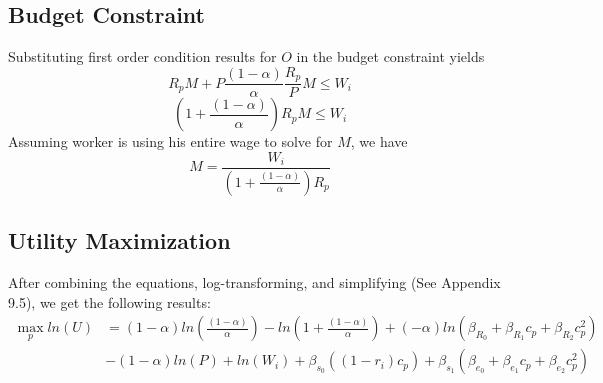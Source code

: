 \documentclass{article}
\begin{document}
\subsection{Budget Constraint}
Substituting first order condition results for $O$ in the budget constraint yields
$$R_{p}M + P\frac{(1 - \alpha)}{\alpha}\frac{R_{p}}{P}M \leq W_{i}$$
$$(1 + \frac{(1 - \alpha)}{\alpha})R_{p}M \leq W_{i}$$
Assuming worker is using his entire wage to solve for $M$, we have
$$M = \frac{W_{i}}{(1 + \frac{(1 - \alpha)}{\alpha})R_{p}}$$
\subsection{Utility Maximization}
After combining the equations, log-transforming, and simplifying (See Appendix 9.5), we get the following results:
\begin{equation*}
    \begin{aligned}
    \max_{p} ln(U) & = (1-\alpha)ln(\frac{(1 - \alpha)}{\alpha}) - ln(1 + \frac{(1 - \alpha)}{\alpha}) + (-\alpha)ln(\beta_{R_0} + \beta_{R_1} c_p + \beta_{R_2} c_p^2)\\
    &  - (1-\alpha)ln(P) + ln(W_{i}) + \beta_{s_0} ((1-r_i) c_p) + \beta_{s_1} (\beta_{e_0} + \beta_{e_1} c_p + \beta_{e_2} c_p^2)
    \end{aligned}
\end{equation*}
\end{document}
